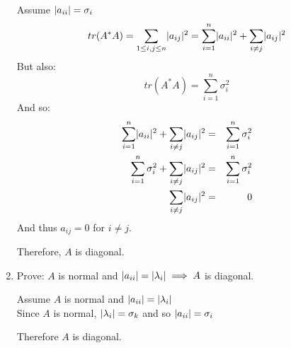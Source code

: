 \documentclass[letterpaper,12pt,fleqn]{article}
\renewcommand{\l}{\lambda}
\renewcommand{\o}{\sigma}
\renewcommand{\l}{\lambda}
\begin{document}
\begin{enumerate}[label={\alph*)}]
  Assume $\abs{a_{ii}}=\o_i$
  \[tr(A^*A)=\sum_{1\le i,j\le n}\lvert a_{ij}\rvert^2=
  \sum_{i=1}^n\lvert a_{ii}\rvert^2+\sum_{i\ne j}\lvert a_{ij}\rvert^2\]
  But also:
  \[tr(A^*A)=\sum_{i=1}^n\o_i^2\]
  And so:
  \begin{eqnarray*}
    \sum_{i=1}^n\abs{a_{ii}}^2+\sum_{i\ne j}\abs{a_{ij}}^2 &=& \sum_{i=1}^n\o_i^2 \\
    \sum_{i=1}^n\o_i^2+\sum_{i\ne j}\abs{a_{ij}}^2 &=& \sum_{i=1}^n\o_i^2 \\
    \sum_{i\ne j}\abs{a_{ij}}^2 &=& 0
  \end{eqnarray*}
  And thus $a_{ij}=0$ for $i\ne j$.

  Therefore, $A$ is diagonal.

\item Prove: $A$ is normal and $\abs{a_{ii}}=\abs{\l_i}\implies A$ is diagonal.

  Assume $A$ is normal and $\abs{a_{ii}}=\abs{\l_i}$ \\
  Since $A$ is normal, $\abs{\l_i}=\o_k$ and so $\abs{a_{ii}}=\o_i$

  Therefore $A$ is diagonal.
\end{enumerate}
\end{document}
